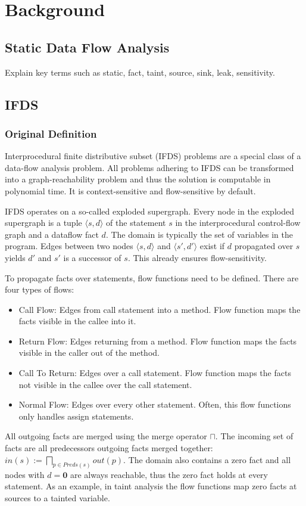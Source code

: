 \documentclass[../draft.tex]{subfiles}
\begin{document}
    \chapter{Background}
    \section{Static Data Flow Analysis}
    Explain key terms such as static, fact, taint, source, sink, leak, sensitivity.
    
    \section{IFDS}
    \subsection{Original Definition}
    Interprocedural finite distributive subset (IFDS) problems are a special class of a data-flow analysis problem. All problems adhering to IFDS can be transformed into a graph-reachability problem and thus the solution is computable in polynomial time. It is context-sensitive and flow-sensitive by default.

    IFDS operates on a so-called exploded supergraph. Every node in the exploded supergraph is a tuple $\langle s, d \rangle$ of the statement $s$ in the interprocedural control-flow graph and a dataflow fact $d$. The domain is typically the set of variables in the program. Edges between two nodes $\langle s, d \rangle$ and $\langle s', d' \rangle$ exist if $d$ propagated over $s$ yields $d'$ and $s'$ is a successor of $s$. This already ensures flow-sensitivity.

    To propagate facts over statements, flow functions need to be defined. There are four types of flows:
    \begin{itemize}
        \item Call Flow: Edges from call statement into a method. Flow function maps the facts visible in the callee into it. 
        \item Return Flow: Edges returning from a method. Flow function maps the facts visible in the caller out of the method.
        \item Call To Return: Edges over a call statement. Flow function maps the facts not visible in the callee over the call statement.
        \item Normal Flow: Edges over every other statement. Often, this flow functions only handles assign statements.
    \end{itemize}
    All outgoing facts are merged using the merge operator $\sqcap$. The incoming set of facts are all predecessors outgoing facts merged together: $in(s) := \bigsqcap_{p \in Preds(s)} out(p)$.
    The domain also contains a zero fact and all nodes with $d=\textbf{0}$ are always reachable, thus the zero fact holds at every statement. As an example, in taint analysis the flow functions map zero facts at sources to a tainted variable. 
\end{document}
